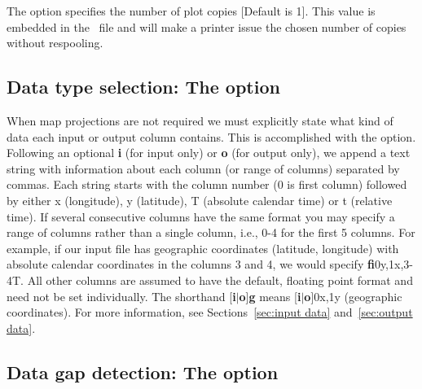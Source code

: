The  option specifies the number of plot copies [Default is 1].  This
value is embedded in the \PS\ file and will make a printer issue the chosen
number of copies without respooling.

\subsection{Data type selection: The  option}

When map projections are not required we must explicitly state
what kind of data each input or output column contains.  This is accomplished with
the  option.  Following an optional \textbf{i} (for input only) or \textbf{o} (for output
only), we append a text string with information about each column (or range of columns) separated by commas.
Each string starts with the column number (0 is first column) followed by either
x (longitude), y (latitude), T (absolute calendar time) or t (relative time).  If
several consecutive columns have the same format you may specify a range of columns
rather than a single column, i.e., 0-4 for the first 5 columns.  For example, if our
input file has geographic coordinates (latitude, longitude) with absolute calendar
coordinates in the columns 3 and 4, we would specify \textbf{fi}0y,1x,3-4T.  All other columns
are assumed to have the default, floating point format and need not be set individually.
The shorthand [\textbf{i}$|$\textbf{o}]\textbf{g} means [\textbf{i}$|$\textbf{o}]0x,1y (geographic coordinates).
For more information, see Sections~\ref{sec:input data} and~\ref{sec:output data}.

\subsection{Data gap detection: The  option}

